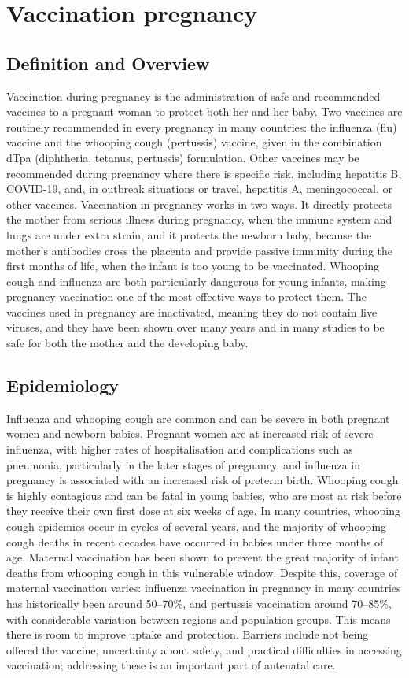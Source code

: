 \chapter{Vaccination pregnancy}

\section*{Definition and Overview}
Vaccination during pregnancy is the administration of safe and recommended vaccines to a pregnant woman to protect both her and her baby. Two vaccines are routinely recommended in every pregnancy in many countries: the influenza (flu) vaccine and the whooping cough (pertussis) vaccine, given in the combination dTpa (diphtheria, tetanus, pertussis) formulation. Other vaccines may be recommended during pregnancy where there is specific risk, including hepatitis B, COVID-19, and, in outbreak situations or travel, hepatitis A, meningococcal, or other vaccines. Vaccination in pregnancy works in two ways. It directly protects the mother from serious illness during pregnancy, when the immune system and lungs are under extra strain, and it protects the newborn baby, because the mother's antibodies cross the placenta and provide passive immunity during the first months of life, when the infant is too young to be vaccinated. Whooping cough and influenza are both particularly dangerous for young infants, making pregnancy vaccination one of the most effective ways to protect them. The vaccines used in pregnancy are inactivated, meaning they do not contain live viruses, and they have been shown over many years and in many studies to be safe for both the mother and the developing baby.

\section*{Epidemiology}
Influenza and whooping cough are common and can be severe in both pregnant women and newborn babies. Pregnant women are at increased risk of severe influenza, with higher rates of hospitalisation and complications such as pneumonia, particularly in the later stages of pregnancy, and influenza in pregnancy is associated with an increased risk of preterm birth. Whooping cough is highly contagious and can be fatal in young babies, who are most at risk before they receive their own first dose at six weeks of age. In many countries, whooping cough epidemics occur in cycles of several years, and the majority of whooping cough deaths in recent decades have occurred in babies under three months of age. Maternal vaccination has been shown to prevent the great majority of infant deaths from whooping cough in this vulnerable window. Despite this, coverage of maternal vaccination varies: influenza vaccination in pregnancy in many countries has historically been around 50--70\%, and pertussis vaccination around 70--85\%, with considerable variation between regions and population groups. This means there is room to improve uptake and protection. Barriers include not being offered the vaccine, uncertainty about safety, and practical difficulties in accessing vaccination; addressing these is an important part of antenatal care.

